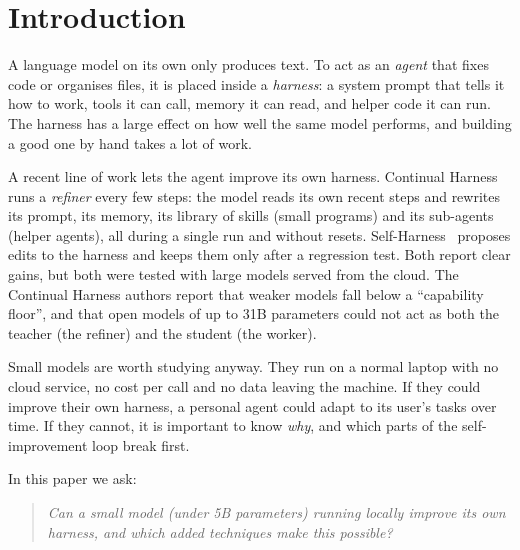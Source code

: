\section{Introduction}
\label{sec:intro}

A language model on its own only produces text. To act as an \emph{agent} that fixes code or
organises files, it is placed inside a \emph{harness}: a system prompt that tells it how to work,
tools it can call, memory it can read, and helper code it can run. The harness has a large effect
on how well the same model performs, and building a good one by hand takes a lot of work.

A recent line of work lets the agent improve its own harness. Continual Harness~\cite{karten2026continual}
runs a \emph{refiner} every few steps: the model reads its own recent steps and rewrites its prompt,
its memory, its library of skills (small programs) and its sub-agents (helper agents), all during a
single run and without resets. Self-Harness~\cite{zhang2026selfharness} proposes edits to the harness
and keeps them only after a regression test. Both report clear gains, but both were tested with
large models served from the cloud. The Continual Harness authors report that weaker models fall
below a ``capability floor'', and that open models of up to 31B parameters could not act as both
the teacher (the refiner) and the student (the worker).

Small models are worth studying anyway. They run on a normal laptop with no cloud service, no
cost per call and no data leaving the machine. If they could improve their own harness, a personal
agent could adapt to its user's tasks over time. If they cannot, it is important to know \emph{why},
and which parts of the self-improvement loop break first.

In this paper we ask:
\begin{quote}
\emph{Can a small model (under 5B parameters) running locally improve its own harness, and which
added techniques make this possible?}
\end{quote}

